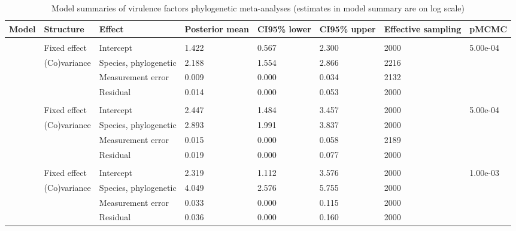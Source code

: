 \begin{table}

\caption{\label{tab:}Model summaries of virulence factors phylogenetic meta-analyses (estimates in model summary are on log scale)}
\centering
\begin{tabular}[t]{llllllll}
\toprule
Model & Structure & Effect & Posterior
 mean & CI95\% lower & CI95\% upper & Effective
 sampling & pMCMC\\
\midrule
\addlinespace[0.3em]
\multicolumn{8}{l}{\textbf{Secretome}}\\
\hspace{1em} & Fixed effect & Intercept & 1.422 & 0.567 & 2.300 & 2000 & 5.00e-04\\
\hspace{1em} & (Co)variance & Species, phylogenetic & 2.188 & 1.554 & 2.866 & 2216 & \\
\hspace{1em} &  & Measurement error & 0.009 & 0.000 & 0.034 & 2132 & \\
\hspace{1em} &  & Residual & 0.014 & 0.000 & 0.053 & 2000 \vphantom{2} & \\
\addlinespace[0.3em]
\multicolumn{8}{l}{\textbf{Biofilm}}\\
\hspace{1em} & Fixed effect & Intercept & 2.447 & 1.484 & 3.457 & 2000 & 5.00e-04\\
\hspace{1em} & (Co)variance & Species, phylogenetic & 2.893 & 1.991 & 3.837 & 2000 & \\
\hspace{1em} &  & Measurement error & 0.015 & 0.000 & 0.058 & 2189 & \\
\hspace{1em} &  & Residual & 0.019 & 0.000 & 0.077 & 2000 & \\
\addlinespace[0.3em]
\multicolumn{8}{l}{\textbf{Siderophores}}\\
\hspace{1em} & Fixed effect & Intercept & 2.319 & 1.112 & 3.576 & 2000 & 1.00e-03\\
\hspace{1em} & (Co)variance & Species, phylogenetic & 4.049 & 2.576 & 5.755 & 2000 & \\
\hspace{1em} &  & Measurement error & 0.033 & 0.000 & 0.115 & 2000 & \\
\hspace{1em} &  & Residual & 0.036 & 0.000 & 0.160 & 2000 & \\

\end{tabular}
\end{table}

